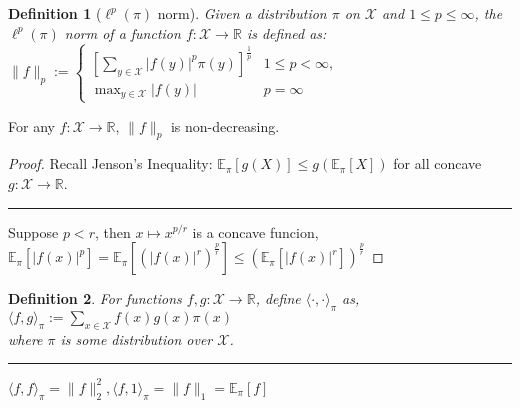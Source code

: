 \documentclass{beamer}
\newtheorem{define}{Definition}
\def\<{\langle}
\def\>{\rangle}
\def\E{\mathbb{E}}
\begin{document}
\begin{frame}[t]
  \scriptsize
  \begin{define}[$\ell^p(\pi)$ norm]
    Given a distribution $\pi$ on $\mathcal{X}$ and $1 \leq p \leq \infty$,
    the $\ell^p(\pi)$ norm of a function $f : \mathcal{X} \to \mathbb{R}$ is defined as:
    $ \parallel f \parallel_p := \left\{
      \begin{array}{ll}
        \left[\sum_{y\in\mathcal{X}} |f(y)|^p \pi(y)\right]^{\frac{1}{p}} & 1 \leq p < \infty, \\
        \max_{y\in\mathcal{X}} |f(y)| & p = \infty
      \end{array}
      \right.
    $
  \end{define}
  \begin{fact}
    For any $f: \mathcal{X} \to \mathbb{R}$, $\parallel f \parallel_p$ is non-decreasing.
  \end{fact}
  \begin{proof}
    Recall Jenson's Inequality: $\E_\pi[g(X)] \leq g(\E_\pi[X])$ for all concave $g: \mathcal{X}\to\mathbb{R}$.
    \vspace{1mm}
    \hrule
    \vspace{1mm}
    Suppose $p < r$, then $x\mapsto x^{p/r}$ is a concave funcion,\\
    $ \E_{\pi}\left[|f(x)|^p\right] = \E_\pi\left[(|f(x)|^r)^{\frac{p}{r}}\right] \leq (\E_\pi \left[|f(x)|^r\right])^{\frac{p}{r}}$
  \end{proof}
  \begin{define}
    For functions $f, g : \mathcal{X} \to \mathbb{R}$, define $\<\cdot, \cdot\>_\pi$ as, \\
    \begingroup
    \centering $\<f, g\>_\pi := \sum_{x\in\mathcal{X}} f(x)g(x)\pi(x)$ \\
    \endgroup
    where $\pi$ is some distribution over $\mathcal{X}$.
    \vspace{1mm}
    \hrule
    \vspace{1mm}
    $\<f, f\>_\pi = \parallel f \parallel_2^2, \<f, 1\>_\pi = \parallel f \parallel_1 = \E_\pi [f]$
  \end{define}
\end{frame}
\end{document}
